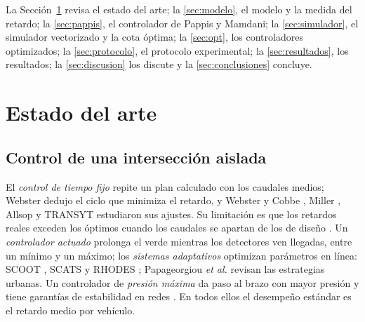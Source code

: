 \documentclass[journal]{IEEEtran}
\begin{document}
La Sección~\ref{sec:sota} revisa el estado del arte; la \ref{sec:modelo}, el modelo y la medida del retardo; la \ref{sec:pappis}, el controlador de Pappis y Mamdani; la \ref{sec:simulador}, el simulador vectorizado y la cota óptima; la \ref{sec:opt}, los controladores optimizados; la \ref{sec:protocolo}, el protocolo experimental; la \ref{sec:resultados}, los resultados; la \ref{sec:discusion} los discute y la \ref{sec:conclusiones} concluye.

\section{Estado del arte}
\label{sec:sota}

\subsection{Control de una intersección aislada}
El \emph{control de tiempo fijo} repite un plan calculado con los caudales medios; Webster \cite{Webster1958} dedujo el ciclo que minimiza el retardo, y Webster y Cobbe \cite{Webster1966}, Miller \cite{Miller1963}, Allsop \cite{Allsop1971} y TRANSYT \cite{Robertson1969} estudiaron sus ajustes. Su limitación es que los retardos reales exceden los óptimos cuando los caudales se apartan de los de diseño \cite{Pappis1977}. Un \emph{controlador actuado} prolonga el verde mientras los detectores ven llegadas, entre un mínimo y un máximo; los \emph{sistemas adaptativos} optimizan parámetros en línea: SCOOT \cite{Hunt1982}, SCATS \cite{Lowrie1982} y RHODES \cite{Mirchandani2001}; Papageorgiou \emph{et al.} \cite{Papageorgiou2003} revisan las estrategias urbanas. Un controlador de \emph{presión máxima} da paso al brazo con mayor presión y tiene garantías de estabilidad en redes \cite{Varaiya2013}. En todos ellos el desempeño estándar es el retardo medio por vehículo.
\end{document}
